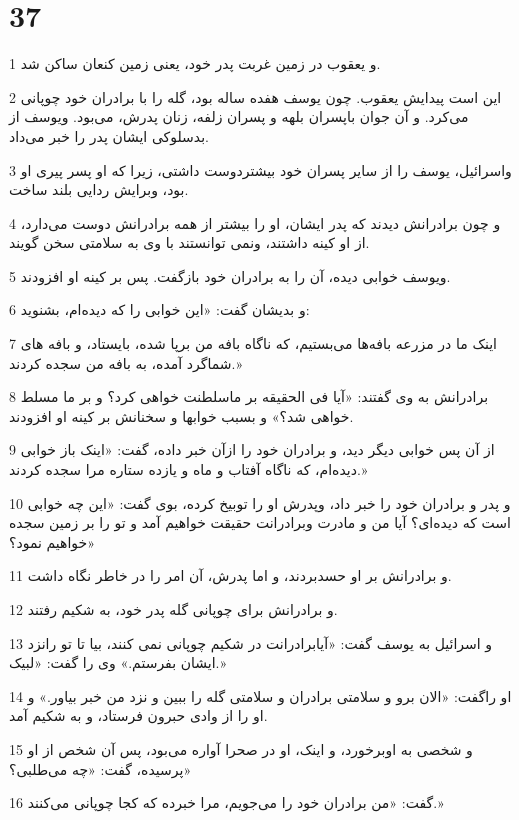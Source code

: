 \chapter{37}

\par 1 و یعقوب در زمین غربت پدر خود، یعنی زمین کنعان ساکن شد.
\par 2 این است پیدایش یعقوب. چون یوسف هفده ساله بود، گله را با برادران خود چوپانی می‌کرد. و آن جوان باپسران بلهه و پسران زلفه، زنان پدرش، می‌بود. ویوسف از بدسلوکی ایشان پدر را خبر می‌داد.
\par 3 واسرائیل، یوسف را از سایر پسران خود بیشتردوست داشتی، زیرا که او پسر پیری او بود، وبرایش ردایی بلند ساخت.
\par 4 و چون برادرانش دیدند که پدر ایشان، او را بیشتر از همه برادرانش دوست می‌دارد، از او کینه داشتند، ونمی توانستند با وی به سلامتی سخن گویند.
\par 5 ویوسف خوابی دیده، آن را به برادران خود بازگفت. پس بر کینه او افزودند.
\par 6 و بدیشان گفت: «این خوابی را که دیده‌ام، بشنوید:
\par 7 اینک ما در مزرعه بافه‌ها می‌بستیم، که ناگاه بافه من برپا شده، بایستاد، و بافه های شماگرد آمده، به بافه من سجده کردند.»
\par 8 برادرانش به وی گفتند: «آیا فی الحقیقه بر ماسلطنت خواهی کرد؟ و بر ما مسلط خواهی شد؟» و بسبب خوابها و سخنانش بر کینه او افزودند.
\par 9 از آن پس خوابی دیگر دید، و برادران خود را ازآن خبر داده، گفت: «اینک باز خوابی دیده‌ام، که ناگاه آفتاب و ماه و یازده ستاره مرا سجده کردند.»
\par 10 و پدر و برادران خود را خبر داد، وپدرش او را توبیخ کرده، بوی گفت: «این چه خوابی است که دیده‌ای؟ آیا من و مادرت وبرادرانت حقیقت خواهیم آمد و تو را بر زمین سجده خواهیم نمود؟»
\par 11 و برادرانش بر او حسدبردند، و اما پدرش، آن امر را در خاطر نگاه داشت.
\par 12 و برادرانش برای چوپانی گله پدر خود، به شکیم رفتند.
\par 13 و اسرائیل به یوسف گفت: «آیابرادرانت در شکیم چوپانی نمی کنند، بیا تا تو رانزد ایشان بفرستم.» وی را گفت: «لبیک.»
\par 14 او راگفت: «الان برو و سلامتی برادران و سلامتی گله را ببین و نزد من خبر بیاور.» و او را از وادی حبرون فرستاد، و به شکیم آمد.
\par 15 و شخصی به اوبرخورد، و اینک، او در صحرا آواره می‌بود، پس آن شخص از او پرسیده، گفت: «چه می‌طلبی؟»
\par 16 گفت: «من برادران خود را می‌جویم، مرا خبرده که کجا چوپانی می‌کنند.»
